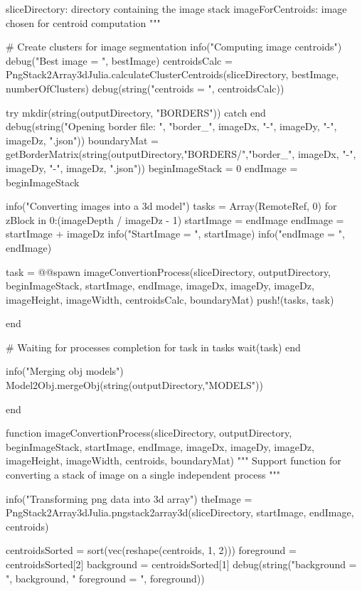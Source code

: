 \documentclass[11pt,oneside]{article}	%
\begin{document}
{  sliceDirectory: directory containing the image stack
  imageForCentroids: image chosen for centroid computation
  """


  # Create clusters for image segmentation
  info("Computing image centroids")
  debug("Best image = ", bestImage)
  centroidsCalc = PngStack2Array3dJulia.calculateClusterCentroids(sliceDirectory, bestImage, numberOfClusters)
  debug(string("centroids = ", centroidsCalc))

  try
    mkdir(string(outputDirectory, "BORDERS"))
  catch
  end
  debug(string("Opening border file: ", "border_", imageDx, "-", imageDy, "-", imageDz, ".json"))
  boundaryMat = getBorderMatrix(string(outputDirectory,"BORDERS/","border_", imageDx, "-",
                                       imageDy, "-", imageDz, ".json"))
  beginImageStack = 0
  endImage = beginImageStack

  info("Converting images into a 3d model")
  tasks = Array(RemoteRef, 0)
  for zBlock in 0:(imageDepth / imageDz - 1)
    startImage = endImage
    endImage = startImage + imageDz
    info("StartImage = ", startImage)
    info("endImage = ", endImage)

    task = @@spawn imageConvertionProcess(sliceDirectory, outputDirectory,
                           beginImageStack, startImage, endImage,
                           imageDx, imageDy, imageDz,
                           imageHeight, imageWidth,
                           centroidsCalc, boundaryMat)
    push!(tasks, task)

  end

  # Waiting for processes completion
  for task in tasks
    wait(task)
  end

  info("Merging obj models")
  Model2Obj.mergeObj(string(outputDirectory,"MODELS"))

end

function imageConvertionProcess(sliceDirectory, outputDirectory,
                                beginImageStack, startImage, endImage,
                                imageDx, imageDy, imageDz,
                                imageHeight, imageWidth,
                                centroids, boundaryMat)
  """
  Support function for converting a stack of image on a single
  independent process
  """

  info("Transforming png data into 3d array")
  theImage = PngStack2Array3dJulia.pngstack2array3d(sliceDirectory, startImage, endImage, centroids)

  centroidsSorted = sort(vec(reshape(centroids, 1, 2)))
  foreground = centroidsSorted[2]
  background = centroidsSorted[1]
  debug(string("background = ", background, " foreground = ", foreground))

}
\end{document}
